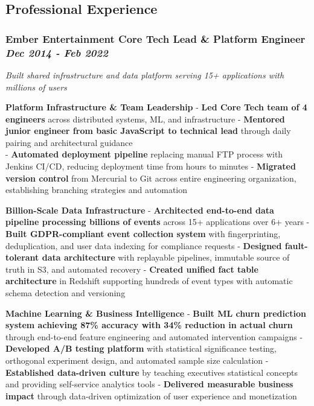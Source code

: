 \documentclass[
]{article}
\begin{document}
\subsection{Professional Experience}\label{professional-experience}

\subsubsection{\texorpdfstring{\textbf{Ember Entertainment} \textbar{}
Core Tech Lead \& Platform Engineer \textbar{} \emph{Dec 2014 - Feb
2022}}{Ember Entertainment \textbar{} Core Tech Lead \& Platform Engineer \textbar{} Dec 2014 - Feb 2022}}\label{ember-entertainment-core-tech-lead-platform-engineer-dec-2014---feb-2022}

\emph{Built shared infrastructure and data platform serving 15+
applications with millions of users}

\textbf{Platform Infrastructure \& Team Leadership} - \textbf{Led Core
Tech team of 4 engineers} across distributed systems, ML, and
infrastructure - \textbf{Mentored junior engineer from basic JavaScript
to technical lead} through daily pairing and architectural guidance\\
- \textbf{Automated deployment pipeline} replacing manual FTP process
with Jenkins CI/CD, reducing deployment time from hours to minutes -
\textbf{Migrated version control} from Mercurial to Git across entire
engineering organization, establishing branching strategies and
automation

\textbf{Billion-Scale Data Infrastructure} - \textbf{Architected
end-to-end data pipeline processing billions of events} across 15+
applications over 6+ years - \textbf{Built GDPR-compliant event
collection system} with fingerprinting, deduplication, and user data
indexing for compliance requests - \textbf{Designed fault-tolerant data
architecture} with replayable pipelines, immutable source of truth in
S3, and automated recovery - \textbf{Created unified fact table
architecture} in Redshift supporting hundreds of event types with
automatic schema detection and versioning

\textbf{Machine Learning \& Business Intelligence} - \textbf{Built ML
churn prediction system achieving 87\% accuracy with 34\% reduction in
actual churn} through end-to-end feature engineering and automated
intervention campaigns - \textbf{Developed A/B testing platform} with
statistical significance testing, orthogonal experiment design, and
automated sample size calculation - \textbf{Established data-driven
culture} by teaching executives statistical concepts and providing
self-service analytics tools - \textbf{Delivered measurable business
impact} through data-driven optimization of user experience and
monetization
\end{document}
